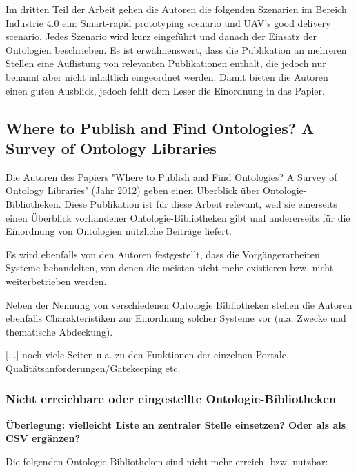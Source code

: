 \documentclass{article}
\begin{document}
Im dritten Teil der Arbeit gehen die Autoren die folgenden Szenarien im Bereich Industrie 4.0 ein: Smart-rapid prototyping scenario und UAV’s good delivery scenario.
Jedes Szenario wird kurz eingeführt und danach der Einsatz der Ontologien beschrieben.
Es ist erwähnenswert, dass die Publikation an mehreren Stellen eine Auflistung von relevanten Publikationen enthält, die jedoch nur benannt aber nicht inhaltlich eingeordnet werden. Damit bieten die Autoren einen guten Ausblick, jedoch fehlt dem Leser die Einordnung in das Papier.






\subsection{Where to Publish and Find Ontologies? A Survey of Ontology Libraries}

Die Autoren des Papiers "Where to Publish and Find Ontologies? A Survey of Ontology Libraries" \cite{d2012publish} (Jahr 2012) geben einen Überblick über Ontologie-Bibliotheken.
Diese Publikation ist für diese Arbeit relevant, weil sie einerseits einen Überblick vorhandener Ontologie-Bibliotheken gibt und andererseits für die Einordnung von Ontologien nützliche Beiträge liefert.

Es wird ebenfalls von den Autoren festgestellt, dass die Vorgängerarbeiten Systeme behandelten, von denen die meisten nicht mehr existieren bzw. nicht weiterbetrieben werden.

Neben der Nennung von verschiedenen Ontologie Bibliotheken stellen die Autoren ebenfalls Charakteristiken zur Einordnung solcher Systeme vor (u.a. Zwecke und thematische Abdeckung).

[...] noch viele Seiten u.a. zu den Funktionen der einzelnen Portale, Qualitätsanforderungen/Gatekeeping etc.

\subsubsection{Nicht erreichbare oder eingestellte Ontologie-Bibliotheken}

\textbf{Überlegung: vielleicht Liste an zentraler Stelle einsetzen? Oder als als CSV ergänzen?}

Die folgenden Ontologie-Bibliotheken sind nicht mehr erreich- bzw. nutzbar:
\end{document}
